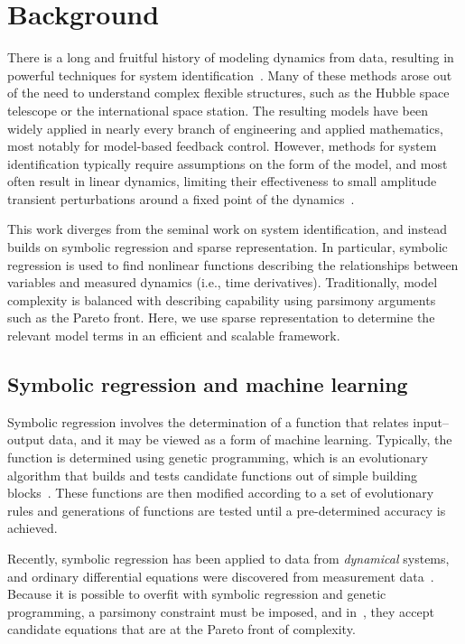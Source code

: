 \documentclass[onecolumn,11pt]{article}
\begin{document}
\section{Background}\label{sec:background}
There is a long and fruitful history of modeling dynamics from data, resulting in powerful techniques for system identification~\cite{ljung:book}.  
Many of these methods arose out of the need to understand complex flexible structures, such as the Hubble space telescope or the international space station.  
The resulting models have been widely applied in nearly every branch of engineering and applied mathematics, most notably for model-based feedback control.  
However, methods for system identification typically require assumptions on the form of the model, and most often result in linear dynamics, limiting their effectiveness to small amplitude transient perturbations around a fixed point of the dynamics~\cite{guckenheimer_holmes}.  

This work diverges from the seminal work on system identification, and instead builds on symbolic regression and sparse representation.  
In particular, symbolic regression is used to find nonlinear functions describing the relationships between variables and measured dynamics (i.e., time derivatives).  
Traditionally, model complexity is balanced with describing capability using parsimony arguments such as the Pareto front.  
Here, we use sparse representation to determine the relevant model terms in an efficient and scalable framework.

\subsection{Symbolic regression and machine learning}\label{sec:SymReg}
Symbolic regression involves the determination of a function that relates input--output data, and it may be viewed as a form of machine learning.  
Typically, the function is determined using genetic programming, which is an evolutionary algorithm that builds and tests candidate functions out of simple building blocks~\cite{koza1992genetic}.  
These functions are then modified according to a set of evolutionary rules and generations of functions are tested until a pre-determined accuracy is achieved.  

Recently, symbolic regression has been applied to data from \emph{dynamical} systems, and ordinary differential equations were discovered from measurement data~\cite{Schmidt2009science}.  
Because it is possible to overfit with symbolic regression and genetic programming, a parsimony constraint must be imposed, and in~\cite{Schmidt2009science}, they accept candidate equations that are at the Pareto front of complexity.
\end{document}
